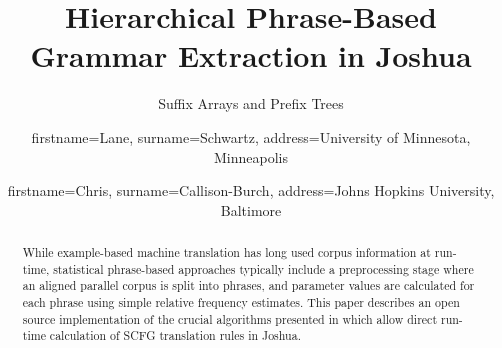 \documentclass{pbml}
\begin{document}
% 

\title{Hierarchical Phrase-Based Grammar Extraction in Joshua}


\subtitle{Suffix Arrays and Prefix Trees}


\author{firstname=Lane, surname=Schwartz,
       address={University of Minnesota, Minneapolis}}

\author{firstname=Chris, surname=Callison-Burch,
       address={Johns Hopkins University, Baltimore}}

% 



\maketitle


% 

\begin{abstract}
While example-based machine translation has long used corpus information at run-time, statistical phrase-based approaches typically include a preprocessing stage where an aligned parallel corpus is split into phrases, and parameter values are calculated for each phrase using simple relative frequency estimates. This paper describes an open source implementation of the crucial algorithms presented in \cite{Lopez2008} which allow direct run-time calculation of SCFG translation rules in Joshua.
\end{abstract}
\end{document}
